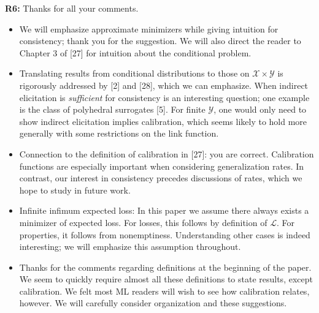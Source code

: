 \documentclass{article}
\newcommand{\X}{\mathcal{X}}
\newcommand{\Y}{\mathcal{Y}}
\begin{document}
\textbf{R6:} Thanks for all your comments.
\begin{itemize}[itemsep=1pt,topsep=0pt]
\item 
We will emphasize approximate minimizers while giving intuition for consistency; thank you for the suggestion.  We will also direct the reader to Chapter 3 of [27] for intuition about the conditional problem.

\item 
Translating results from conditional distributions to those on $\X \times \Y$ is rigorously addressed by [2] and [28], which we can emphasize. When indirect elicitation is \emph{sufficient} for consistency is an interesting question; one example is the class of polyhedral surrogates [5]. For finite $\Y$, one would only need to show indirect elicitation implies calibration, which seems likely to hold more generally with some restrictions on the link function.

\item 
Connection to the definition of calibration in [27]: you are correct. Calibration functions are especially important when considering generalization rates. In contrast, our interest in consistency precedes discussions of rates, which we hope to study in future work.

\item 
Infinite infimum expected loss: In this paper we assume there always exists a minimizer of expected loss. For losses, this follows by definition of $\mathcal{L}$. For properties, it follows from nonemptiness. Understanding other cases is indeed interesting; we will emphasize this assumption throughout.

\item 
Thanks for the comments regarding definitions at the beginning of the paper. We seem to quickly require almost all these definitions to state results, except calibration. We felt most ML readers will wish to see how calibration relates, however.  We will carefully consider organization and these suggestions.
\end{itemize}
\end{document}
